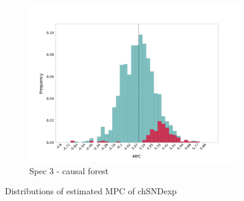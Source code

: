 \begin{figure}[t]
\begin{subfigure}{0.33\linewidth}
        \includegraphics[width=\linewidth]{figures/distributions/spec3_cf_chSNDexp.png}
        \caption{Spec 3 - causal forest}
    \end{subfigure}\hfill
    \caption{Distributions of estimated MPC of chSNDexp}
\end{figure}
